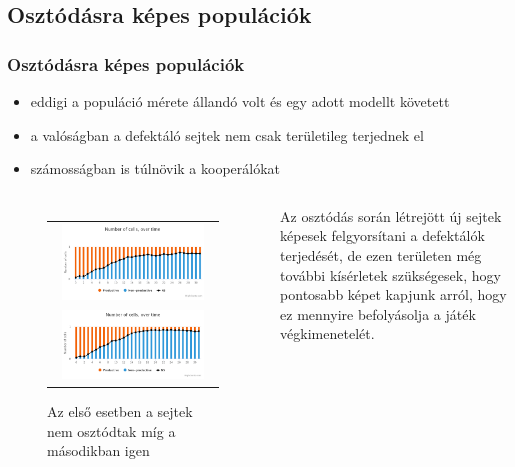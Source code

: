 \subsection{Osztódásra képes populációk}
\begin{frame}
	\frametitle{Osztódásra képes populációk}
	\begin{itemize}
		\item eddigi a populáció mérete állandó volt és egy adott modellt követett
		\item a valóságban a defektáló sejtek nem csak területileg terjednek el
		\item számosságban is túlnövik a kooperálókat
	\end{itemize}
	
	\begin{columns}
			\begin{figure}[ht]
				\centering
				\begin{tabular}{c}
					\includegraphics[width=0.9\textwidth]{images/nemosztodik}
					\\
					\includegraphics[width=0.9\textwidth]{images/osztodik}
				\end{tabular}
				\caption{Az első esetben a sejtek nem osztódtak míg a másodikban igen}				\label{fig:Divide}
			\end{figure}
			\begin{block}{}
				Az osztódás során létrejött új sejtek képesek felgyorsítani a defektálók terjedését, de ezen területen még további kísérletek szükségesek, hogy pontosabb képet kapjunk arról, hogy ez mennyire befolyásolja a játék végkimenetelét.
			\end{block}
	\end{columns}
\end{frame}

